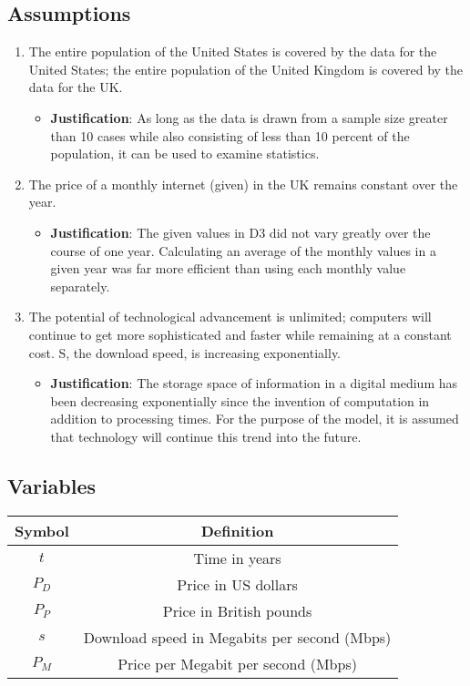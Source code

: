 	\subsection*{Assumptions}
	\begin{enumerate}
   \item The entire population of the United States is covered by the data for the United States; the entire population of the United Kingdom is covered by the data for the UK.
   \begin{itemize}
     \item \textbf{Justification}: As long as the data is drawn from a sample size greater than 10 cases while also consisting of less than 10 percent of the population, it can be used to examine statistics.
   \end{itemize}
   \item The price of a monthly internet (given) in the UK remains constant over the year.
   \begin{itemize}
     \item \textbf{Justification}: The given values in D3 did not vary greatly over the course of one year. Calculating an average of the monthly values in a given year was far more efficient than using each monthly value separately.
   \end{itemize}
   \item The potential of technological advancement is unlimited; computers will continue to get more sophisticated and faster while remaining at a constant cost. S, the download speed, is increasing exponentially.
   \begin{itemize}
     \item \textbf{Justification}: The storage space of information in a digital medium has been decreasing exponentially since the invention of computation in addition to processing times. For the purpose of the model, it is assumed that technology will continue this trend into the future.
   \end{itemize}
\end{enumerate}

	\subsection*{Variables}

	\begin{center} \begin{tabular} {|c|c|}
		\hline
		Symbol & Definition \\
		\hline
		$t$ & Time in years\\
		\hline
		$P_D$ & Price in US dollars \\
		\hline
		$P_P$ & Price in British pounds \\
		\hline
		$s$ & Download speed in Megabits per second (Mbps) \\
		\hline
		$P_M$ & Price per Megabit per second (Mbps) \\
		\hline
	\end{tabular} \end{center}


